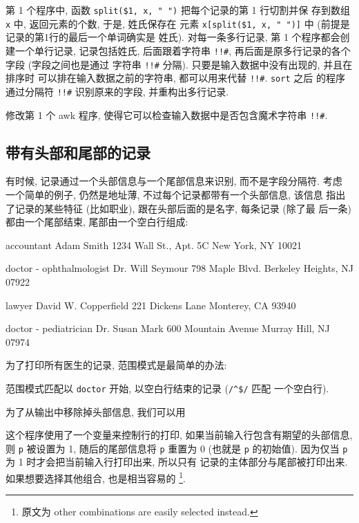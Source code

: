 第 1 个程序中, 函数 \verb'split($1, x, " ")' 把每个记录的第 1 行切割并保
存到数组 \verb'x' 中, 返回元素的个数, 于是, 姓氏保存在 
元素 \verb'x[split($1, x, " ")]' 中 (前提是记录的第1行的最后一个单词确实是
姓氏). 对每一条多行记录, 第 1 个程序都会创建一个单行记录, 记录包括姓氏,
后面跟着字符串 \verb'!!#', 再后面是原多行记录的各个字段 (字段之间也是通过
字符串 \verb'!!#' 分隔). 只要是输入数据中没有出现的, 并且在排序时
可以排在输入数据之前的字符串, 都可以用来代替 \verb'!!#'. \verb'sort' 之后
的程序通过分隔符 \verb'!!#' 识别原来的字段, 并重构出多行记录.

\begin{exercise}
    修改第 1 个 awk 程序, 使得它可以检查输入数据中是否包含魔术字符串
    \verb'!!#'.
\end{exercise}

\subsection{带有头部和尾部的记录}
\label{subsec:records_with_headers_and_trailers}

有时候, 记录通过一个头部信息与一个尾部信息来识别, 而不是字段分隔符. 考虑 
一个简单的例子, 仍然是地址薄, 不过每个记录都带有一个头部信息, 该信息
指出了记录的某些特征 (比如职业), 跟在头部后面的是名字, 每条记录 (除了最
后一条) 都由一个尾部结束, 尾部由一个空白行组成:
\begin{shell}
    accountant
    Adam Smith
    1234 Wall St., Apt. 5C
    New York, NY 10021

    doctor - ophthalmologist
    Dr. Will Seymour
    798 Maple Blvd.
    Berkeley Heights, NJ 07922

    lawyer
    David W. Copperfield
    221 Dickens Lane
    Monterey, CA 93940

    doctor - pediatrician
    Dr. Susan Mark
    600 Mountain Avenue
    Murray Hill, NJ 07974
\end{shell}
为了打印所有医生的记录, 范围模式是最简单的办法:
范围模式匹配以 \verb'doctor' 开始, 以空白行结束的记录 (\verb'/^$/' 匹配 
一个空白行).

为了从输出中移除掉头部信息, 我们可以用 
这个程序使用了一个变量来控制行的打印, 如果当前输入行包含有期望的头部信息, 
则 \verb'p' 被设置为 1, 随后的尾部信息将 \verb'p' 重置为 0 (也就是 \verb'p'
的初始值). 因为仅当 \verb'p' 为 1 时才会把当前输入行打印出来, 所以只有
记录的主体部分与尾部被打印出来. 如果想要选择其他组合, 也是相当容易的
\footnote{原文为 other combinations are easily selected instead.}.

